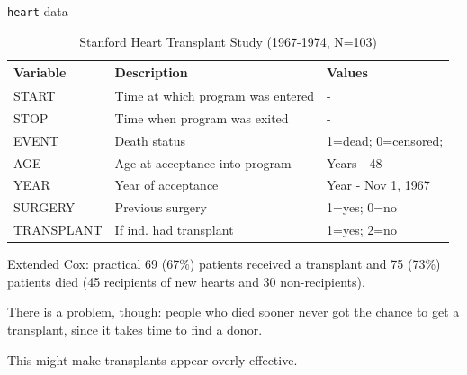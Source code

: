 \documentclass[12pt,english,pdf,xcolor=dvipsnames,aspectratio=169,handout]{beamer}\usepackage[]{graphicx}\usepackage[]{xcolor}
\begin{document}
\begin{frame}{\texttt{heart} data}

\begin{table}
\centering
\scriptsize
\begin{tabular}{l l l}
\toprule
Variable & Description & Values \\
\midrule
START & Time at which program was entered & - \\
STOP & Time when program was exited & - \\
EVENT & Death status & 1=dead; 0=censored; \\
AGE & Age at acceptance into program & Years - 48 \\
YEAR & Year of acceptance & Year - Nov 1, 1967 \\
SURGERY & Previous surgery & 1=yes; 0=no \\
TRANSPLANT & If ind. had transplant & 1=yes; 2=no \\
\bottomrule
\end{tabular}
\caption*{Stanford Heart Transplant Study (1967-1974, N=103)}
\end{table}
\end{frame}



\begin{frame}[fragile]{Extended Cox: practical}
69 (67\%) patients received a transplant and 75 (73\%) patients died (45 recipients of new hearts and 30 non-recipients).\bigskip

There is a problem, though: people who died sooner never got the chance to get a transplant, since it takes time to find a donor.\bigskip

This might make transplants appear overly effective.
\end{frame}
\end{document}
